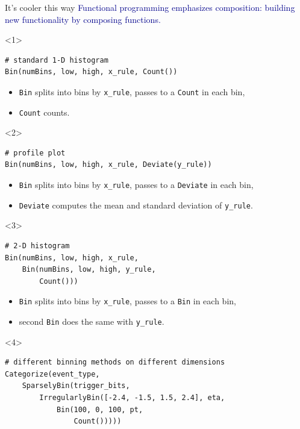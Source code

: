 \documentclass{beamer}
\begin{document}
\begin{frame}[fragile]{It's cooler this way}
\vfill
\textcolor{darkblue}{Functional programming emphasizes composition: building new functionality by composing functions.}

\vfill
\small
\begin{onlyenv}<1>
\begin{verbatim}
# standard 1-D histogram
Bin(numBins, low, high, x_rule, Count())
\end{verbatim}
\begin{itemize}
\item {\tt\small Bin} splits into bins by {\tt\small x\_rule}, passes to a {\tt\small Count} in each bin,
\item {\tt\small Count} counts.
\end{itemize}
\end{onlyenv}
\begin{onlyenv}<2>
\begin{verbatim}
# profile plot
Bin(numBins, low, high, x_rule, Deviate(y_rule))
\end{verbatim}
\begin{itemize}
\item {\tt\small Bin} splits into bins by {\tt\small x\_rule}, passes to a {\tt\small Deviate} in each bin,
\item {\tt\small Deviate} computes the mean and standard deviation of {\tt\small y\_rule}.
\end{itemize}
\end{onlyenv}
\begin{onlyenv}<3>
\begin{verbatim}
# 2-D histogram
Bin(numBins, low, high, x_rule,
    Bin(numBins, low, high, y_rule,
        Count()))
\end{verbatim}
\begin{itemize}
\item {\tt\small Bin} splits into bins by {\tt\small x\_rule}, passes to a {\tt\small Bin} in each bin,
\item second {\tt\small Bin} does the same with {\tt\small y\_rule}.
\end{itemize}
\end{onlyenv}
\begin{onlyenv}<4>
\begin{verbatim}
# different binning methods on different dimensions
Categorize(event_type,
    SparselyBin(trigger_bits,
        IrregularlyBin([-2.4, -1.5, 1.5, 2.4], eta,
            Bin(100, 0, 100, pt,
                Count()))))

\end{verbatim}
\end{onlyenv}
\end{frame}
\end{document}
